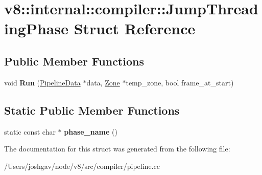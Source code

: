 \hypertarget{structv8_1_1internal_1_1compiler_1_1_jump_threading_phase}{}\section{v8\+:\+:internal\+:\+:compiler\+:\+:Jump\+Threading\+Phase Struct Reference}
\label{structv8_1_1internal_1_1compiler_1_1_jump_threading_phase}
\subsection*{Public Member Functions}
\begin{DoxyCompactItemize}
\item 
void {\bfseries Run} (\hyperlink{classv8_1_1internal_1_1compiler_1_1_pipeline_data}{Pipeline\+Data} $\ast$data, \hyperlink{classv8_1_1internal_1_1_zone}{Zone} $\ast$temp\+\_\+zone, bool frame\+\_\+at\+\_\+start)\hypertarget{structv8_1_1internal_1_1compiler_1_1_jump_threading_phase_a6092be8e2287cdaf43bd20d219a90c2a}{}\label{structv8_1_1internal_1_1compiler_1_1_jump_threading_phase_a6092be8e2287cdaf43bd20d219a90c2a}

\end{DoxyCompactItemize}
\subsection*{Static Public Member Functions}
\begin{DoxyCompactItemize}
\item 
static const char $\ast$ {\bfseries phase\+\_\+name} ()\hypertarget{structv8_1_1internal_1_1compiler_1_1_jump_threading_phase_a3791b1a3a77010f2cad2166563ec7358}{}\label{structv8_1_1internal_1_1compiler_1_1_jump_threading_phase_a3791b1a3a77010f2cad2166563ec7358}

\end{DoxyCompactItemize}


The documentation for this struct was generated from the following file\+:\begin{DoxyCompactItemize}
\item 
/\+Users/joshgav/node/v8/src/compiler/pipeline.\+cc\end{DoxyCompactItemize}
